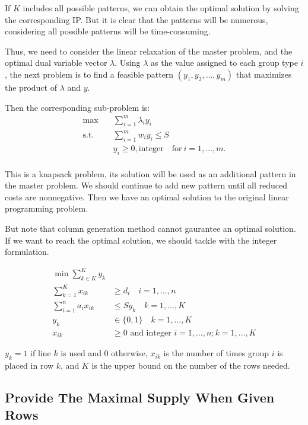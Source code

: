 If $K$ includes all possible patterns, we can obtain the optimal solution by solving the corresponding IP. But it is clear that the patterns will be numerous, considering all possible patterns will be time-consuming.

Thus, we need to consider the linear relaxation of the master problem, and the optimal dual variable vector $\lambda$. Using $\lambda$ as the value assigned to each group type $i$, the next problem is to find a feasible pattern $(y_1,y_2,\ldots,y_m)$ that maximizes the product of $\lambda$ and $y$.


Then the corresponding sub-problem is:
\[\begin{split}\mbox{max}\quad & \sum_{i=1}^m \lambda_i y_{i}\\
        \mbox{s.t.} \quad & \sum_{i=1}^m w_i y_i \leq S  \\
        & y_i \geq 0, \mbox{integer}\quad \mbox{for}~ i=1,\ldots,m.\\
\end{split}\]

This is a knapsack problem, its solution will be used as an additional pattern in the master problem.
We should continue to add new pattern until all reduced costs are nonnegative. Then we have an optimal solution to the original linear programming problem.

But note that column generation method cannot gaurantee an optimal solution. If we want to reach the optimal solution, we should tackle with the integer formulation.

\begin{equation}
\begin{aligned}
\min \sum_{k \in K}^{K} y_{k} & \\
\sum_{k=1}^{K} x_{i k} & \geq d_{i} \quad i=1, \ldots, n \\
\sum_{i=1}^{n} a_{i} x_{i k} & \leq S y_{k} \quad k=1, \ldots, K \\
y_{k} & \in\{0,1\} \quad k=1, \ldots, K \\
x_{i k} & \geq 0 \text { and integer } i=1, \ldots, n ; k=1, \ldots, K
\end{aligned}
\end{equation}

$y_k =1$ if line $k$ is used and 0 otherwise, $x_{ik}$ is the number of times group $i$ is placed in row $k$, and $K$ is the upper bound on the number of the rows needed.

\subsection{Provide The Maximal Supply When Given Rows}\label{maximal_supply}

